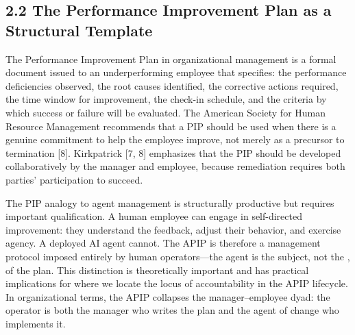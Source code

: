 \subsection{2.2  The Performance Improvement Plan as a Structural Template}

The Performance Improvement Plan in organizational management is a formal document issued to an underperforming employee that specifies: the performance deficiencies observed, the root causes identified, the corrective actions required, the time window for improvement, the check-in schedule, and the criteria by which success or failure will be evaluated. The American Society for Human Resource Management recommends that a PIP should be used when there is a genuine commitment to help the employee improve, not merely as a precursor to termination [8]. Kirkpatrick [7, 8] emphasizes that the PIP should be developed collaboratively by the manager and employee, because remediation requires both parties' participation to succeed.

The PIP analogy to agent management is structurally productive but requires important qualification. A human employee can engage in self-directed improvement: they understand the feedback, adjust their behavior, and exercise agency. A deployed AI agent cannot. The APIP is therefore a management protocol imposed entirely by human operators---the agent is the subject, not the , of the plan. This distinction is theoretically important and has practical implications for where we locate the locus of accountability in the APIP lifecycle. In organizational terms, the APIP collapses the manager--employee dyad: the operator is both the manager who writes the plan and the agent of change who implements it.

